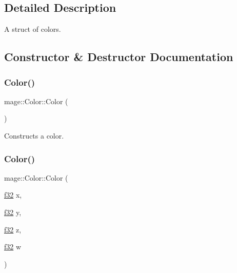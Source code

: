 \subsection{Detailed Description}
A struct of colors. 

\subsection{Constructor \& Destructor Documentation}
\hypertarget{structmage_1_1_color_a542f26c61d9c67098302b0262c518758}{}\label{structmage_1_1_color_a542f26c61d9c67098302b0262c518758} 
\subsubsection{\texorpdfstring{Color()}{Color()}\hspace{0.1cm}{\footnotesize\ttfamily [1/6]}}
{\footnotesize\ttfamily mage\+::\+Color\+::\+Color (\begin{DoxyParamCaption}{ }\end{DoxyParamCaption})\hspace{0.3cm}{\ttfamily [noexcept]}}

Constructs a color. \hypertarget{structmage_1_1_color_ad3cd2f679a74481281f8284169aa376e}{}\label{structmage_1_1_color_ad3cd2f679a74481281f8284169aa376e} 
\subsubsection{\texorpdfstring{Color()}{Color()}\hspace{0.1cm}{\footnotesize\ttfamily [2/6]}}
{\footnotesize\ttfamily mage\+::\+Color\+::\+Color (\begin{DoxyParamCaption}\item[{\hyperlink{namespacemage_a6a44ad388483959dc4dff9f2aef91431}{f32}}]{x,  }\item[{\hyperlink{namespacemage_a6a44ad388483959dc4dff9f2aef91431}{f32}}]{y,  }\item[{\hyperlink{namespacemage_a6a44ad388483959dc4dff9f2aef91431}{f32}}]{z,  }\item[{\hyperlink{namespacemage_a6a44ad388483959dc4dff9f2aef91431}{f32}}]{w }\end{DoxyParamCaption})\hspace{0.3cm}{\ttfamily [noexcept]}}

